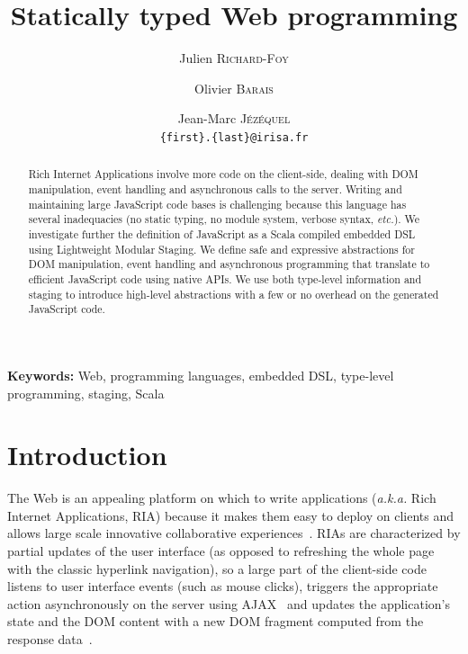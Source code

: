 \documentclass[american,english,runningheads]{llncs}
\newcommand{\etal}{\emph{et al.~}}
\newcommand{\etc}{\emph{etc.}}
\newcommand{\aka}{\emph{a.k.a.}}
\newcommand{\noun}[1]{\textsc{#1}}
\begin{document}
\title{Statically typed Web programming}

\author{Julien \noun{Richard-Foy} \and Olivier \noun{Barais} \and Jean-Marc \noun{Jézéquel}\\
\texttt{\{first\}.\{last\}@irisa.fr}}

\authorrunning{Julien \noun{Richard-Foy} \etal{}}

\maketitle


\begin{abstract}
Rich Internet Applications involve more code on the client-side, dealing with DOM manipulation, event handling and asynchronous calls to the server. Writing and maintaining large JavaScript code bases is challenging because this language has several inadequacies (no static typing, no module system, verbose syntax, \etc{}). We investigate further the definition of JavaScript as a Scala compiled embedded DSL using Lightweight Modular Staging. We define safe and expressive abstractions for DOM manipulation, event handling and asynchronous programming that translate to efficient JavaScript code using native APIs. We use both type-level information and staging to introduce high-level abstractions with a few or no overhead on the generated JavaScript code.
\end{abstract}

{\bf Keywords:} Web, programming languages, embedded DSL, type-level programming, staging, Scala

\section{Introduction}

The Web is an appealing platform on which to write applications (\aka{} Rich Internet Applications, RIA) because it makes them easy to deploy on clients and allows large scale innovative collaborative experiences~\cite{Farrell07_RIA,Mikkonen08_SpaghettiJs}. RIAs are characterized by partial updates of the user interface (as opposed to refreshing the whole page with the classic hyperlink navigation), so a large part of the client-side code listens to user interface events (such as mouse clicks), triggers the appropriate action asynchronously on the server using AJAX~\cite{Garrett05_Ajax} and updates the application’s state and the DOM content with a new DOM fragment computed from the response data~\cite{Farrell07_RIA,Busch09_StateOfArtRIA}.
\end{document}
